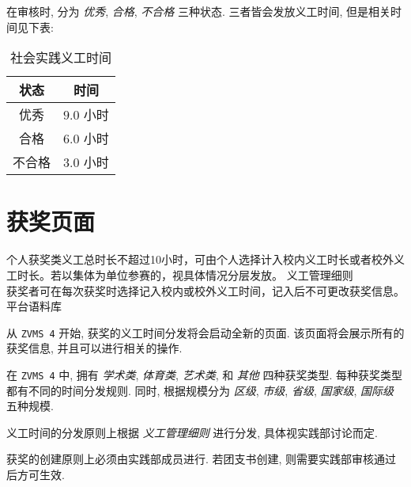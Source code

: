 \documentclass{article}
\begin{document}
在审核时, 分为 \textit{优秀}, \textit{合格}, \textit{不合格} 三种状态. 三者皆会发放义工时间, 但是相关时间见下表:

\begin{table}[H]
  \centering
  \begin{tabular}{cc}
    \hline
    \textbf{状态} & \textbf{时间} \\
    \hline
    优秀 & $9.0$ 小时 \\
    合格 & $6.0$ 小时 \\
    不合格 & $3.0$ 小时 \\
    \hline
  \end{tabular}
  \caption{社会实践义工时间}
  \label{tab:practice}
\end{table}

\section{获奖页面}

\begin{mdframed}
  \fangsong
  个人获奖类义工总时长不超过10小时，可由个人选择计入校内义工时长或者校外义工时长。若以集体为单位参赛的，视具体情况分层发放。 \hfill 义工管理细则 \\
  获奖者可在每次获奖时选择记入校内或校外义工时间，记入后不可更改获奖信息。 \hfill 平台语料库
\end{mdframed}

从 \texttt{ZVMS 4} 开始, 获奖的义工时间分发将会启动全新的页面. 该页面将会展示所有的获奖信息, 并且可以进行相关的操作.

在 \texttt{ZVMS 4} 中, 拥有 \textit{学术类}, \textit{体育类}, \textit{艺术类}, 和 \textit{其他} 四种获奖类型. 每种获奖类型都有不同的时间分发规则. 同时, 根据规模分为 \textit{区级}, \textit{市级}, \textit{省级}, \textit{国家级}, \textit{国际级} 五种规模.

义工时间的分发原则上根据 \textit{义工管理细则} 进行分发, 具体视实践部讨论而定.

获奖的创建原则上必须由实践部成员进行. 若团支书创建, 则需要实践部审核通过后方可生效.
\end{document}
